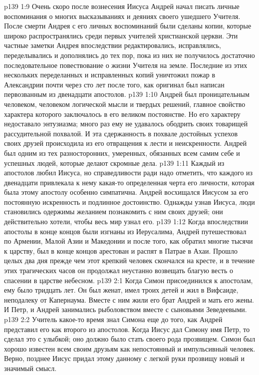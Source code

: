 \vs p139 1:9 Очень скоро после вознесения Иисуса Андрей начал писать личные воспоминания о многих высказываниях и деяниях своего ушедшего Учителя. После смерти Андрея с его личных воспоминаний были сделаны копии, которые широко распространялись среди первых учителей христианской церкви. Эти частные заметки Андрея впоследствии редактировались, исправлялись, переделывались и дополнялись до тех пор, пока из них не получилось достаточно последовательное повествование о жизни Учителя на земле. Последние из этих нескольких переделанных и исправленных копий уничтожил пожар в Александрии почти через сто лет после того, как оригинал был написан первозванным из двенадцати апостолов.
\vs p139 1:10 Андрей был проницательным человеком, человеком логической мысли и твердых решений, главное свойство характера которого заключалось в его великом постоянстве. Но его характеру недоставало энтузиазма; много раз ему не удавалось ободрить своих товарищей рассудительной похвалой. И эта сдержанность в похвале достойных успехов своих друзей происходила из его отвращения к лести и неискренности. Андрей был одним из тех разносторонних, умеренных, обязанных всем самим себе и успешных людей, которые делают скромные дела.
\vs p139 1:11 \pc Каждый из апостолов любил Иисуса, но справедливости ради надо отметить, что каждого из двенадцати привлекала к нему какая\hyp{}то определенная черта его личности, которая была этому апостолу особенно симпатична. Андрей восхищался Иисусом за его постоянную искренность и подлинное достоинство. Однажды узнав Иисуса, люди становились одержимы желанием познакомить с ним своих друзей; они действительно хотели, чтобы весь мир узнал его.
\vs p139 1:12 \pc Когда впоследствии апостолы в конце концов были изгнаны из Иерусалима, Андрей путешествовал по Армении, Малой Азии и Македонии и после того, как обратил многие тысячи к царству, был в конце концов арестован и распят в Патрае в Ахаи. Прошло целых два дня прежде чем этот крепкий человек скончался на кресте, и в течение этих трагических часов он продолжал неустанно возвещать благую весть о спасении в царстве небесном.
\vs p139 2:1 Когда Симон присоединился к апостолам, ему было тридцать лет. Он был женат, имел троих детей и жил в Вифсаиде, неподалеку от Капернаума. Вместе с ним жили его брат Андрей и мать его жены. И Петр, и Андрей занимались рыболовством вместе с сыновьями Зеведеевыми.
\vs p139 2:2 Учитель какое\hyp{}то время знал Симона еще до того, как Андрей представил его как второго из апостолов. Когда Иисус дал Симону имя Петр, то сделал это с улыбкой; оно должно было стать своего рода прозвищем. Симон был хорошо известен всем своим друзьям как непостоянный и импульсивный человек. Верно, позднее Иисус придал этому данному с легкой руки прозвищу новый и значимый смысл.
